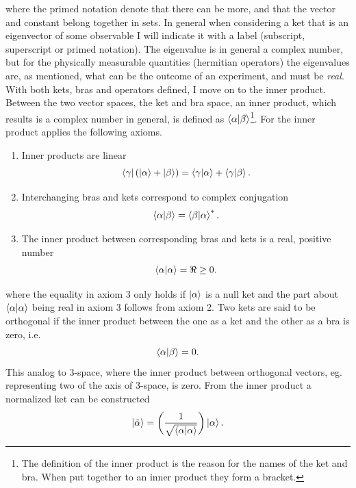 where the primed notation denote that there can be more, and that the vector and constant belong together in sets. In general when considering a ket that is an eigenvector of some observable I will indicate it with a label (subscript, superscript or primed notation). The eigenvalue is in general a complex number, but for the physically measurable quantities (hermitian operators) the eigenvalues are, as mentioned, what can be the outcome of an experiment, and must be \emph{real}.\newline
With both kets, bras and operators defined, I move on to the inner product. Between the two vector spaces, the ket and bra space, an inner product, which results is a complex number in general, is defined as $\braket{\alpha|\beta}$\footnote{The definition of the inner product is the reason for the names of the ket and bra. When put together to an inner product they form a bracket.}. For the inner product applies the following axioms.
\begin{enumerate} 
	\item Inner products are linear
	\begin{equation}
		\bra{\gamma}(\ket{\alpha}+\ket{\beta})=\braket{\gamma|\alpha}+\braket{\gamma|\beta}.
	\end{equation}  
	\item Interchanging bras and kets correspond to complex conjugation
	\begin{equation}
		\braket{\alpha|\beta}=\braket{\beta|\alpha}^*.
	\end{equation} 
	\item The inner product between corresponding bras and kets is a real, positive number
	\begin{equation}
		\braket{\alpha|\alpha}=\Re\geq 0.
	\end{equation} 
\end{enumerate}
where the equality in axiom 3 only holds if $\ket{\alpha}$ is a null ket and the part about $\braket{\alpha|\alpha}$ being real in axiom 3 follows from axiom 2. Two kets are said to be orthogonal if the inner product between the one as a ket and the other as a bra is zero,  i.e.
\begin{equation}
	\braket{\alpha|\beta}=0.
\end{equation}   
This analog to 3-space, where the inner product between orthogonal vectors, eg. representing two of the axis of 3-space, is zero.  From the inner product a normalized ket can be constructed
\begin{equation}
	\ket{\tilde{\alpha}}=\bigg(\frac{1}{\sqrt{\braket{\alpha|\alpha}}}\bigg)\ket{\alpha}.
	\label{norm}
\end{equation} 
